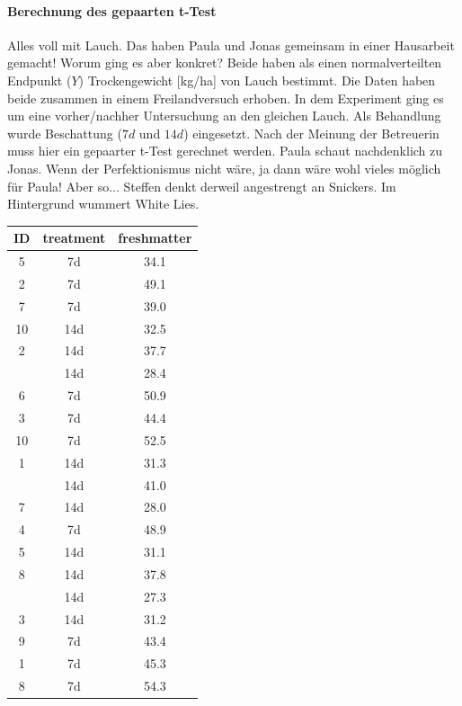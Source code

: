 \documentclass[a4paper, 9pt]{scrartcl}\usepackage[]{graphicx}\usepackage[]{xcolor}
\begin{document}
\ifcollection
\paragraph{Berechnung des gepaarten t-Test}
\fi

Alles voll mit Lauch. Das haben Paula und Jonas gemeinsam in einer Hausarbeit gemacht! Worum ging es aber konkret? Beide haben als einen normalverteilten Endpunkt ($Y$) Trockengewicht [kg/ha] von Lauch bestimmt. Die Daten haben beide zusammen in einem Freilandversuch erhoben. In dem Experiment ging es um eine vorher/nachher Untersuchung an den gleichen Lauch. Als Behandlung wurde Beschattung ($7d$ und $14d$) eingesetzt. Nach der Meinung der Betreuerin muss hier ein gepaarter t-Test gerechnet werden. Paula schaut nachdenklich zu Jonas. Wenn der Perfektionismus nicht wäre, ja dann wäre wohl vieles möglich für Paula! Aber so... Steffen denkt derweil angestrengt an Snickers. Im Hintergrund wummert White Lies.

\begin{table}[!h]
\centering
\begin{tabular}{ccc}
\toprule
ID & treatment & freshmatter\\
\midrule
5 & 7d & 34.1\\
2 & 7d & 49.1\\
7 & 7d & 39.0\\
10 & 14d & 32.5\\
2 & 14d & 37.7\\
\addlinespace
9 & 14d & 28.4\\
6 & 7d & 50.9\\
3 & 7d & 44.4\\
10 & 7d & 52.5\\
1 & 14d & 31.3\\
\addlinespace
6 & 14d & 41.0\\
7 & 14d & 28.0\\
4 & 7d & 48.9\\
5 & 14d & 31.1\\
8 & 14d & 37.8\\
\addlinespace
4 & 14d & 27.3\\
3 & 14d & 31.2\\
9 & 7d & 43.4\\
1 & 7d & 45.3\\
8 & 7d & 54.3\\
\bottomrule
\end{tabular}
\end{table}
\end{document}
